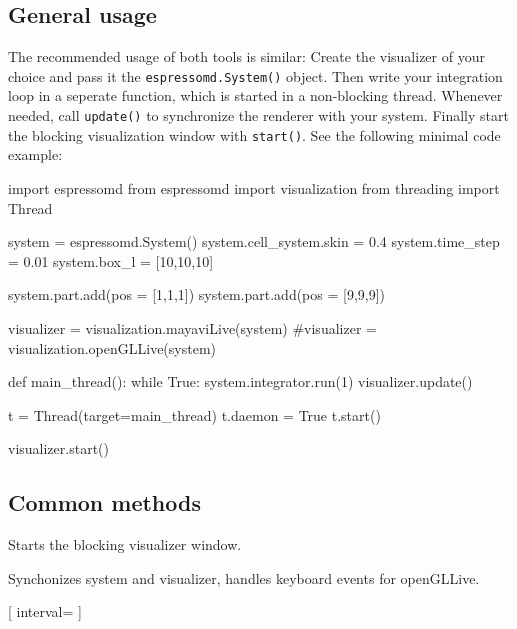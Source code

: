 \subsection{General usage}

The recommended usage of both tools is similar: Create the visualizer of your
choice and pass it the \lstinline{espressomd.System()} object. Then write your
integration loop in a seperate function, which is started in a non-blocking
thread. Whenever needed, call \lstinline{update()} to synchronize the renderer
with your system. Finally start the blocking visualization window with
\lstinline{start()}. See the following minimal code example:

\begin{pycode}
import espressomd
from espressomd import visualization
from threading import Thread

system = espressomd.System()
system.cell_system.skin = 0.4
system.time_step = 0.01
system.box_l = [10,10,10]

system.part.add(pos = [1,1,1])
system.part.add(pos = [9,9,9])

visualizer = visualization.mayaviLive(system)
#visualizer = visualization.openGLLive(system)

def main_thread():
    while True:
        system.integrator.run(1)
        visualizer.update()

t = Thread(target=main_thread)
t.daemon = True
t.start()

visualizer.start()
\end{pycode}

\subsection{Common methods}


\begin{pysyntax}
\end{pysyntax}

Starts the blocking visualizer window.

\begin{pysyntax}
\end{pysyntax}

Synchonizes system and visualizer, handles keyboard events for openGLLive. 

\begin{pysyntax}
  [
    interval=
]
\end{pysyntax}

